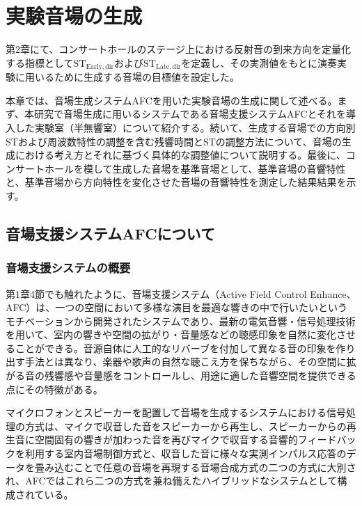 \documentclass[11pt,a4j]{jreport}
\begin{document}
\chapter{実験音場の生成}

第2章にて、コンサートホールのステージ上における反射音の到来方向を定量化する指標として$\mathrm{ST_{Early,dir}}$および$\mathrm{ST_{Late,dir}}$を定義し、その実測値をもとに演奏実験に用いるために生成する音場の目標値を設定した。

本章では、音場生成システムAFCを用いた実験音場の生成に関して述べる。まず、本研究で音場生成に用いるシステムである音場支援システムAFCとそれを導入した実験室（半無響室）について紹介する。続いて、生成する音場での方向別STおよび周波数特性の調整を含む残響時間とSTの調整方法について、音場の生成における考え方とそれに基づく具体的な調整値について説明する。最後に、コンサートホールを模して生成した音場を基準音場として、基準音場の音響特性と、基準音場から方向特性を変化させた音場の音響特性を測定した結果結果を示す。


\section{音場支援システムAFCについて}

\subsection*{音場支援システムの概要}
第1章4節でも触れたように、音場支援システム（Active Field Control Enhance、AFC）は、一つの空間において多様な演目を最適な響きの中で行いたいというモチベーションから開発されたシステムであり、最新の電気音響・信号処理技術を用いて、室内の響きや空間の拡がり・音量感などの聴感印象を自然に変化させることができる\cite{AFCの概要}。音源自体に人工的なリバーブを付加して異なる音の印象を作り出す手法とは異なり、楽器や歌声の自然な聴こえ方を保ちながら、その空間に拡がる音の残響感や音量感をコントロールし、用途に適した音響空間を提供できる点にその特徴がある。

マイクロフォンとスピーカーを配置して音場を生成するシステムにおける信号処理の方式は、マイクで収音した音をスピーカーから再生し、スピーカーからの再生音に空間固有の響きが加わった音を再びマイクで収音する音響的フィードバックを利用する室内音場制御方式と、収音した音に様々な実測インパルス応答のデータを畳み込むことで任意の音場を再現する音場合成方式の二つの方式に大別され、AFCではこれら二つの方式を兼ね備えたハイブリッドなシステムとして構成されている\cite{AFCEnhance}。

\newpage
\end{document}

